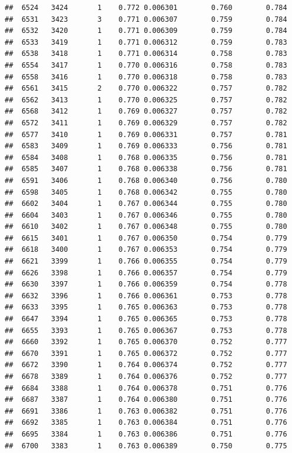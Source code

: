 \documentclass[
]{book}
\begin{document}
\begin{verbatim}
##  6524   3424       1    0.772 0.006301        0.760        0.784
##  6531   3423       3    0.771 0.006307        0.759        0.784
##  6532   3420       1    0.771 0.006309        0.759        0.784
##  6533   3419       1    0.771 0.006312        0.759        0.783
##  6538   3418       1    0.771 0.006314        0.758        0.783
##  6554   3417       1    0.770 0.006316        0.758        0.783
##  6558   3416       1    0.770 0.006318        0.758        0.783
##  6561   3415       2    0.770 0.006322        0.757        0.782
##  6562   3413       1    0.770 0.006325        0.757        0.782
##  6568   3412       1    0.769 0.006327        0.757        0.782
##  6572   3411       1    0.769 0.006329        0.757        0.782
##  6577   3410       1    0.769 0.006331        0.757        0.781
##  6583   3409       1    0.769 0.006333        0.756        0.781
##  6584   3408       1    0.768 0.006335        0.756        0.781
##  6585   3407       1    0.768 0.006338        0.756        0.781
##  6591   3406       1    0.768 0.006340        0.756        0.780
##  6598   3405       1    0.768 0.006342        0.755        0.780
##  6602   3404       1    0.767 0.006344        0.755        0.780
##  6604   3403       1    0.767 0.006346        0.755        0.780
##  6610   3402       1    0.767 0.006348        0.755        0.780
##  6615   3401       1    0.767 0.006350        0.754        0.779
##  6618   3400       1    0.767 0.006353        0.754        0.779
##  6621   3399       1    0.766 0.006355        0.754        0.779
##  6626   3398       1    0.766 0.006357        0.754        0.779
##  6630   3397       1    0.766 0.006359        0.754        0.778
##  6632   3396       1    0.766 0.006361        0.753        0.778
##  6633   3395       1    0.765 0.006363        0.753        0.778
##  6647   3394       1    0.765 0.006365        0.753        0.778
##  6655   3393       1    0.765 0.006367        0.753        0.778
##  6660   3392       1    0.765 0.006370        0.752        0.777
##  6670   3391       1    0.765 0.006372        0.752        0.777
##  6672   3390       1    0.764 0.006374        0.752        0.777
##  6678   3389       1    0.764 0.006376        0.752        0.777
##  6684   3388       1    0.764 0.006378        0.751        0.776
##  6687   3387       1    0.764 0.006380        0.751        0.776
##  6691   3386       1    0.763 0.006382        0.751        0.776
##  6692   3385       1    0.763 0.006384        0.751        0.776
##  6695   3384       1    0.763 0.006386        0.751        0.776
##  6700   3383       1    0.763 0.006389        0.750        0.775

\end{verbatim}
\end{document}
